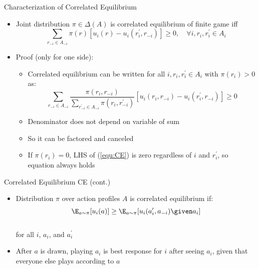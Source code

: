 \documentclass[11pt,aspectratio=169,handout]{beamer}
\begin{document}
  \begin{frame}{Characterization of Correlated Equilibrium}
   \begin{itemize}[<+->] 
    \item Joint distribution $\pi \in \Delta(A)$ is correlated equilibrium of finite game iff
    \begin{equation}
    \label{equ:CE}
     \sum_{r_{-i} \in A_{-i}} \pi(r) \left[u_i(r) - u_i(r^{\prime}_i, r_{-i})\right] \ge 0,\quad  \forall i, r_i, r^{\prime}_i \in A_i
    \end{equation}
    \item Proof (only for one side):
    \begin{itemize}
     \item Correlated equilibrium can be written for all $i, r_i, r^{\prime}_i \in A_i$ with $\pi(r_i) > 0$ as:
     $$
      \sum_{r_{-i} \in A_{-i}} \frac{\pi(r_i,r_{-i})}{\sum_{r^{\prime}_{-i} \in A_{-i}} \pi(r_i, r^{\prime}_{-i})} \left[u_i(r_i, r_{-i}) - u_i(r^{\prime}_i, r_{-i})\right] \ge 0
     $$
     \item Denominator does not depend on variable of sum
     \item So it can be factored and canceled
     \item If $\pi(r_i) = 0$, LHS of (\ref{equ:CE}) is zero regardless of $i$ and $r^{\prime}_i$, so equation always holds
    \end{itemize}
   \end{itemize}
  \end{frame}

   \begin{frame}{Correlated Equilibrium  CE (cont.)}
   \begin{itemize}[<+->]
   \setlength{\itemsep}{1.5em}
    \item Distribution $\pi$ over action profiles $A$ is correlated equilibrium if:
    $$\E_{a \sim \pi}[u_i(a)] \geq \E_{a \sim \pi}[u_i(a_i^\prime, a_{-i}) \given a_i]$$\\
    for all $i$, $a_i$, and $a_i^\prime$
    \item After $a$ is drawn, playing $a_i$ is best response for $i$ \alert{after} seeing $a_i$, given that everyone else plays according to $a$
   \end{itemize}
  \end{frame}
\end{document}
